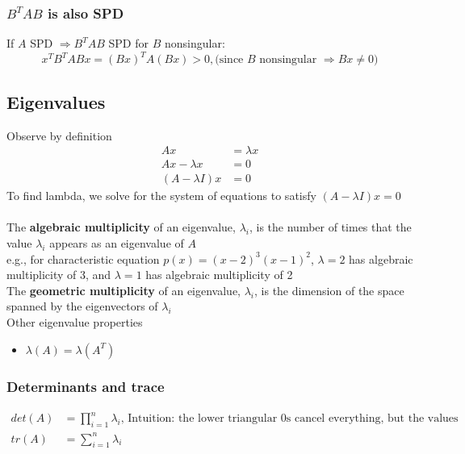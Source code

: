 \documentclass{article}
\begin{document}
\subsubsection{$B^TAB$ is also SPD} 
If $A$ SPD $\Rightarrow B^TAB$ SPD for $B$ nonsingular:
\begin{equation*}
    x^TB^TABx = (Bx)^TA(Bx) > 0, \textrm{(since $B$ nonsingular $\Rightarrow Bx \neq 0$)}
\end{equation*}

\subsection{Eigenvalues}
Observe by definition
\begin{align*}
    Ax&= \lambda x\\
    Ax - \lambda x &= 0\\
    (A - \lambda I)x &= 0
\end{align*}
To find lambda, we solve for the system of equations to satisfy $(A - \lambda I)x = 0$\\ \\
The \textbf{algebraic multiplicity} of an eigenvalue, $\lambda_i$, is the number of times that the value $\lambda_i$ appears as an eigenvalue of $A$\\
e.g., for characteristic equation $p(x) = (x-2)^3(x-1)^2$, $\lambda = 2$ has algebraic multiplicity of 3, and $\lambda = 1$ has algebraic multiplicity of 2\\
The \textbf{geometric multiplicity} of an eigenvalue, $\lambda_i$, is the dimension of the space spanned by the eigenvectors of $\lambda_i$\\
Other eigenvalue properties
\begin{itemize}
    \item $\lambda(A) = \lambda(A^T)$
\end{itemize}

\subsubsection{Determinants and trace}
\begin{align*}
    det(A) &= \prod_{i=1}^n \lambda_i \textrm{, Intuition: the lower triangular 0s cancel everything, but the values in the diagonal}\\
    tr(A) &= \sum_{i=1}^n \lambda_i \\
\end{align*}
\end{document}
